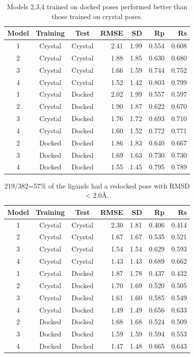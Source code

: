 \begin{table}
\caption{Models 2,3,4 trained on docked poses performed better than those trained on crystal poses.}
\label{rfscore4:set-1-pdbbind-2007}
\begin{tabular}{cccrrrr}
\hline
Model & Training & Test & RMSE & SD & Rp & Rs\\
\hline
1 & Crystal & Crystal & 2.41 & 1.99 & 0.554 & 0.608\\
2 & Crystal & Crystal & 1.88 & 1.85 & 0.630 & 0.680\\
3 & Crystal & Crystal & 1.66 & 1.59 & 0.744 & 0.752\\
4 & Crystal & Crystal & 1.52 & 1.42 & 0.803 & 0.799\\
\hline
1 & Crystal & Docked  & 2.02 & 1.99 & 0.557 & 0.597\\
2 & Crystal & Docked  & 1.90 & 1.87 & 0.622 & 0.670\\
3 & Crystal & Docked  & 1.76 & 1.72 & 0.693 & 0.710\\
4 & Crystal & Docked  & 1.60 & 1.52 & 0.772 & 0.771\\
\hline
2 & Docked  & Docked  & 1.86 & 1.83 & 0.640 & 0.667\\
3 & Docked  & Docked  & 1.69 & 1.63 & 0.730 & 0.730\\
4 & Docked  & Docked  & 1.55 & 1.45 & 0.795 & 0.789\\
\hline
\end{tabular}
\end{table}

\begin{table}
\caption{219/382=57\% of the ligands had a redocked pose with RMSD < 2.0\AA.}
\label{rfscore4:set-2-pdbbind-2012}
\begin{tabular}{cccrrrr}
\hline
Model & Training & Test & RMSE & SD & Rp & Rs\\
\hline
1 & Crystal & Crystal & 2.30 & 1.81 & 0.406 & 0.414\\
2 & Crystal & Crystal & 1.67 & 1.67 & 0.535 & 0.521\\
3 & Crystal & Crystal & 1.54 & 1.54 & 0.629 & 0.593\\
4 & Crystal & Crystal & 1.43 & 1.43 & 0.689 & 0.662\\
\hline
1 & Crystal & Docked  & 1.87 & 1.78 & 0.437 & 0.432\\
2 & Crystal & Docked  & 1.70 & 1.69 & 0.520 & 0.505\\
3 & Crystal & Docked  & 1.61 & 1.60 & 0.585 & 0.549\\
4 & Crystal & Docked  & 1.49 & 1.49 & 0.656 & 0.633\\
\hline
2 & Docked  & Docked  & 1.68 & 1.68 & 0.524 & 0.509\\
3 & Docked  & Docked  & 1.59 & 1.59 & 0.594 & 0.553\\
4 & Docked  & Docked  & 1.47 & 1.48 & 0.665 & 0.643\\
\hline
\end{tabular}
\end{table}

